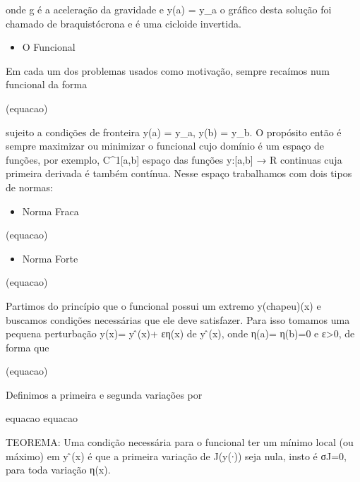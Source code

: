 \documentclass[12pt, a4paper]{article}
\begin{document}
onde g é a aceleração da gravidade e y(a) = y_a  o gráfico desta solução foi chamado de braquistócrona e é uma cicloide invertida.

\begin{itemize}
\item O Funcional
\end{itemize}

Em cada um dos problemas usados como motivação, sempre recaímos num funcional da forma

\begin{center}
(equacao)
\end{center}

sujeito a condições de fronteira y(a) = y_a, y(b) = y_b.
O propósito então é sempre maximizar ou minimizar o funcional cujo domínio é um espaço de funções, por exemplo, C^1[a,b] espaço das funções y:[a,b] → R continuas cuja primeira derivada é também contínua. Nesse espaço trabalhamos com dois tipos de normas:

\begin{itemize}
\item Norma Fraca
\end{itemize}

\begin{center}
(equacao)
\end{center}

\begin{itemize}
\item Norma Forte
\end{itemize}

\begin{center}
(equacao)
\end{center}

Partimos do princípio que o funcional possui um extremo y(chapeu)(x) e buscamos condições necessárias que ele deve satisfazer. Para isso tomamos uma pequena perturbação 
y(x)= y ̂(x)+ εη(x) de y ̂(x), onde η(a)= η(b)=0 e ε>0, de forma que 

\begin{center}
(equacao)
\end{center}

Definimos a primeira e segunda variações por

\begin{center}
equacao
equacao
\end{center}

TEOREMA: Uma condição necessária para o funcional ter um mínimo local (ou máximo) em y ̂(x) é que a primeira variação de J(y(∙)) seja nula, insto é σJ=0, para toda variação η(x).
\end{document}
